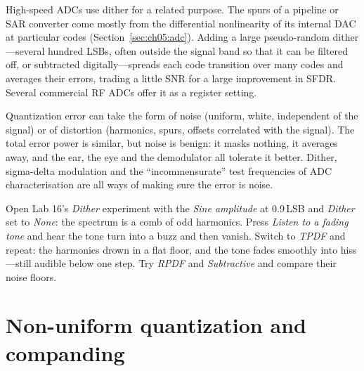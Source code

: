 
High-speed ADCs use dither for a related purpose. The spurs of a pipeline or SAR converter come
mostly from the differential nonlinearity of its internal DAC at particular codes
(Section~\ref{sec:ch05:adc}). Adding a large pseudo-random dither---several hundred LSBs, often
outside the signal band so that it can be filtered off, or subtracted digitally---spreads each
code transition over many codes and averages their errors, trading a little SNR for a large
improvement in SFDR. Several commercial RF ADCs offer it as a register setting.

\begin{keyidea}
Quantization error can take the form of noise (uniform, white, independent of the signal) or of
distortion (harmonics, spurs, offsets correlated with the signal). The total error power is
similar, but noise is benign: it masks nothing, it averages away, and the ear, the eye and the
demodulator all tolerate it better. Dither, sigma-delta modulation and the ``incommensurate''
test frequencies of ADC characterisation are all ways of making sure the error is noise.
\end{keyidea}

\begin{tryit}
Open Lab 16's \emph{Dither} experiment with the \emph{Sine amplitude} at 0.9\,LSB and
\emph{Dither} set to \emph{None}: the spectrum is a comb of odd harmonics. Press \emph{Listen to a
fading tone} and hear the tone turn into a buzz and then vanish. Switch to \emph{TPDF} and repeat:
the harmonics drown in a flat floor, and the tone fades smoothly into hiss---still audible below one
step. Try \emph{RPDF} and \emph{Subtractive} and compare their noise floors.
\end{tryit}

\section{Non-uniform quantization and companding}
\label{sec:ch05:companding}

